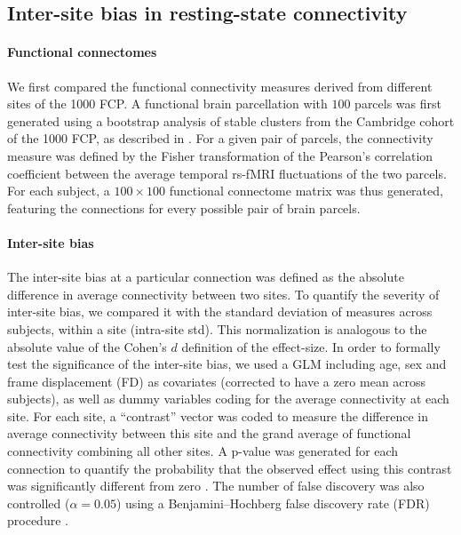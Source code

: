 \documentclass[authoryear]{elsarticle}
\begin{document}
\subsection{Inter-site bias in resting-state connectivity}
\paragraph{Functional connectomes} We first compared the functional connectivity measures derived from different sites of the 1000 FCP. A functional brain parcellation with $100$ parcels was first generated using a bootstrap analysis of stable clusters \citep{Bellec2010c} from the Cambridge cohort of the 1000 FCP, as described in \cite{Orban2015}. For a given pair of parcels, the connectivity measure was defined by the Fisher transformation of the Pearson's correlation coefficient between the average temporal rs-fMRI fluctuations of the two parcels. For each subject, a $100 \times 100$ functional connectome matrix was thus generated, featuring the connections for every possible pair of brain parcels. 

\paragraph{Inter-site bias} The inter-site bias at a particular connection was defined as the absolute difference in average connectivity between two sites. To quantify the severity of inter-site bias, we compared it with the standard deviation of measures across subjects, within a site (intra-site std). This normalization is analogous to the absolute value of the Cohen's $d$ definition of the effect-size. In order to formally test the significance of the inter-site bias, we used a GLM including age, sex and frame displacement (FD) as covariates (corrected to have a zero mean across subjects), as well as dummy variables coding for the average connectivity at each site. For each site, a ``contrast'' vector was coded to measure the difference in average connectivity between this site and the grand average of functional connectivity combining all other sites. A p-value was generated for each connection to quantify the probability that the observed effect using this contrast was significantly different from zero \citep{Worsley1995}. The number of false discovery was also controlled ($\alpha=0.05$) using a Benjamini–Hochberg false discovery rate (FDR) procedure \citep{Benjamini1995}.

\end{document}
